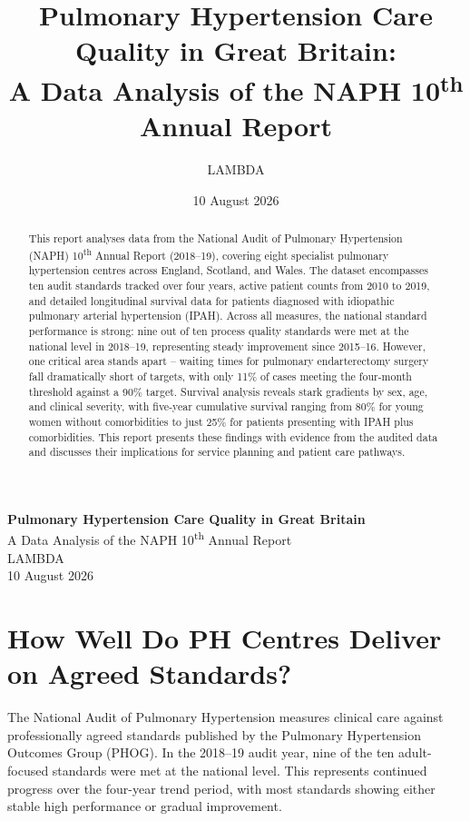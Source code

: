 \documentclass[11pt,a4paper]{article}
\title{Pulmonary Hypertension Care Quality in Great Britain: \\A Data Analysis of the NAPH 10\textsuperscript{th} Annual Report}
\author{LAMBDA}
\date{10 August 2026}
\begin{document}
\thispagestyle{firstpage}

\begin{center}
\vspace*{2.5cm}
{\LARGE \textbf{Pulmonary Hypertension Care Quality in Great Britain}} \\[0.5em]
{\Large A Data Analysis of the NAPH 10\textsuperscript{th} Annual Report} \\[0.5em]
{\large LAMBDA} \\[0.5em]
{\large 10 August 2026}
\end{center}

\begin{abstract}
This report analyses data from the National Audit of Pulmonary Hypertension (NAPH) 10\textsuperscript{th} Annual Report (2018--19), covering eight specialist pulmonary hypertension centres across England, Scotland, and Wales. The dataset encompasses ten audit standards tracked over four years, active patient counts from 2010 to 2019, and detailed longitudinal survival data for patients diagnosed with idiopathic pulmonary arterial hypertension (IPAH). Across all measures, the national standard performance is strong: nine out of ten process quality standards were met at the national level in 2018--19, representing steady improvement since 2015--16. However, one critical area stands apart -- waiting times for pulmonary endarterectomy surgery fall dramatically short of targets, with only 11\% of cases meeting the four-month threshold against a 90\% target. Survival analysis reveals stark gradients by sex, age, and clinical severity, with five-year cumulative survival ranging from 80\% for young women without comorbidities to just 25\% for patients presenting with IPAH plus comorbidities. This report presents these findings with evidence from the audited data and discusses their implications for service planning and patient care pathways.
\end{abstract}

\newpage

\tableofcontents
\newpage

\section{How Well Do PH Centres Deliver on Agreed Standards?}

The National Audit of Pulmonary Hypertension measures clinical care against professionally agreed standards published by the Pulmonary Hypertension Outcomes Group (PHOG). In the 2018--19 audit year, nine of the ten adult-focused standards were met at the national level. This represents continued progress over the four-year trend period, with most standards showing either stable high performance or gradual improvement.
\end{document}
